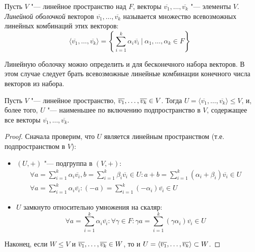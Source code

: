 \begin{definition}
	Пусть $V$ "--- линейное пространство над $F$, векторы $\overline{v_1}, \dots, \overline{v_k}$ "--- элементы $V$. \textit{Линейной оболочкой} векторов $\overline{v_1}, \dots, \overline{v_k}$ называется множество всевозможных линейных комбинаций этих векторов:
	\[\langle\overline{v_1}, \dots, \overline{v_k}\rangle = \left\{\sum_{i = 1}^{k}\alpha_i\overline{v_i}~|~\alpha_1, \dots, \alpha_k \in F\right\}\]
\end{definition}

\begin{note}
	Линейную оболочку можно определить и для бесконечного набора векторов. В этом случае следует брать всевозможные линейные комбинации конечного числа векторов из набора.
\end{note}

\begin{proposition}
	Пусть $V$ "--- линейное пространство, $\overline{v_1}, \dots, \overline{v_k} \hm{\in} V$. Тогда $U = \langle\overline{v_1}, \dots, \overline{v_k}\rangle \le V$, и, более того, $U$ "--- наименьшее по включению подпространство в $V$, содержащее все векторы $\overline{v_1}, \dots, \overline{v_k}$.
\end{proposition}

\begin{proof}
	Сначала проверим, что $U$ является линейным пространством (т.\:е. подпространством в $V$):
	\begin{itemize}
		\item $(U, +)$ "--- подгруппа в $(V, +)$:
		\begin{gather*}
			\forall a = \sum_{i = 1}^{k}\alpha_i\overline{v_i}, b = \sum_{i = 1}^{k}\beta_i\overline{v_i} \in U: a + b = \sum_{i = 1}^{k}(\alpha_i + \beta_i)\overline{v_i} \in U\\
			\forall a = \sum_{i = 1}^{k}\alpha_i\overline{v_i}: (-a) = \sum_{i = 1}^{k}(-\alpha_i)\overline{v_i} \in U
		\end{gather*}
		\item $U$ замкнуто относительно умножения на скаляр:
		\[\forall a = \sum_{i = 1}^{k}\alpha_i\overline{v_i}: \forall \gamma \in F: \gamma a = \sum_{i = 1}^{k}(\gamma\alpha_i)\overline{v_i} \in U\]
	\end{itemize}

	Наконец, если $W \le V$ и $\overline{v_1}, \dots, \overline{v_k} \hm{\in} W$, то и $U = \langle\overline{v_1}, \dots, \overline{v_k}\rangle \hm{\subset} W$.
\end{proof}

